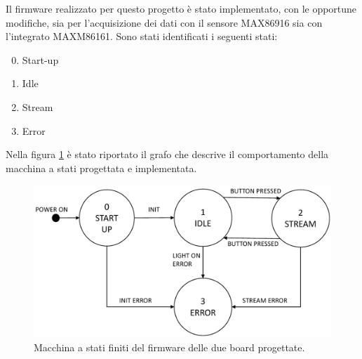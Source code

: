 Il firmware  realizzato per questo progetto è stato implementato, con le opportune modifiche, sia per l'acquisizione dei dati con il sensore MAX86916 sia con l'integrato MAXM86161. Sono stati identificati i seguenti stati:
\begin{enumerate}
	\setcounter{enumi}{-1}
	\item Start-up
	\item Idle
	\item Stream
	\item Error
\end{enumerate}
Nella figura \ref{fig:FSM} è stato riportato il grafo che descrive il comportamento della macchina a stati progettata e implementata.
\begin{figure}[b]
	\centering
	\includegraphics[width=0.6\linewidth]{ImageFiles/Macchina a stati finiti/FSM}
	\caption{Macchina a stati finiti del firmware delle due board progettate.}
	\label{fig:FSM}
\end{figure}

